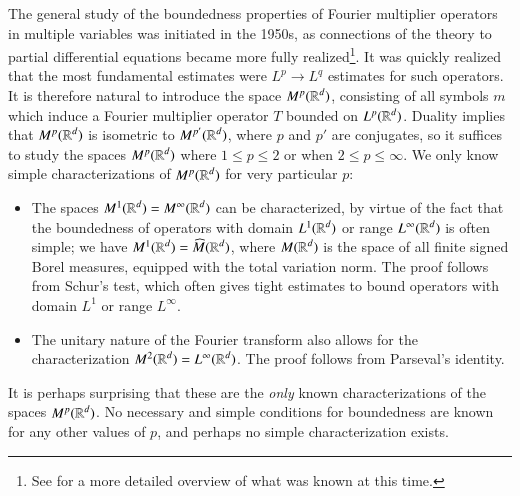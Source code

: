 The general study of the boundedness properties of Fourier multiplier operators in multiple variables was initiated in the 1950s, as connections of the theory to partial differential equations became more fully realized\footnote{See \cite{Hormander1} for a more detailed overview of what was known at this time.}. It was quickly realized that the most fundamental estimates were $L^p \to L^q$ estimates for such operators.
%
%
%
It is therefore natural to introduce the space $M^p(\operatorname{\mathbb{R}}^d)$, consisting of all symbols $m$ which induce a Fourier multiplier operator $T$ bounded on $L^p(\operatorname{\mathbb{R}}^d)$. Duality implies that $M^p(\operatorname{\mathbb{R}}^d)$ is isometric to $M^{p'}(\operatorname{\mathbb{R}}^d)$, where $p$ and $p'$ are conjugates, so it suffices to study the spaces $M^p(\operatorname{\mathbb{R}}^d)$ where $1 \leq p \leq 2$ or when $2 \leq p \leq \infty$. We only know simple characterizations of $M^p(\operatorname{\mathbb{R}}^d)$ for very particular $p$:
%
\begin{itemize}
    \item The spaces $M^1(\operatorname{\mathbb{R}}^d) = M^\infty(\operatorname{\mathbb{R}}^d)$ can be characterized, by virtue of the fact that the boundedness of operators with domain $L^1(\operatorname{\mathbb{R}}^d)$ or range $L^\infty(\operatorname{\mathbb{R}}^d)$ is often simple; we have $M^1(\operatorname{\mathbb{R}}^d) = \widehat{M}(\operatorname{\mathbb{R}}^d)$, where  $M(\operatorname{\mathbb{R}}^d)$ is the space of all finite signed Borel measures, equipped with the total variation norm. The proof follows from Schur's test, which often gives tight estimates to bound operators with domain $L^1$ or range $L^\infty$.

    \item The unitary nature of the Fourier transform also allows for the characterization $M^2(\operatorname{\mathbb{R}}^d) = L^\infty(\operatorname{\mathbb{R}}^d)$. The proof follows from Parseval's identity.
\end{itemize}
%
It is perhaps surprising that these are the \emph{only} known characterizations of the spaces $M^p(\operatorname{\mathbb{R}}^d)$. No necessary and simple conditions for boundedness are known for any other values of $p$, and perhaps no simple characterization exists.

